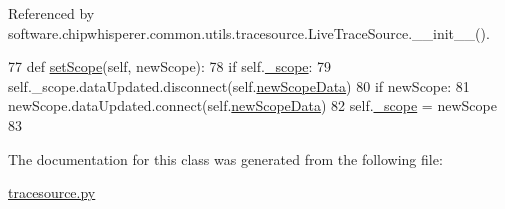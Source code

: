 Referenced by software.\+chipwhisperer.\+common.\+utils.\+tracesource.\+Live\+Trace\+Source.\+\_\+\+\_\+init\+\_\+\+\_\+().


\begin{DoxyCode}
77     \textcolor{keyword}{def }\hyperlink{classsoftware_1_1chipwhisperer_1_1common_1_1utils_1_1tracesource_1_1LiveTraceSource_a8530d7d44e220140a0b226c1f4ebc00d}{setScope}(self, newScope):
78         \textcolor{keywordflow}{if} self.\hyperlink{classsoftware_1_1chipwhisperer_1_1common_1_1utils_1_1tracesource_1_1LiveTraceSource_accb516e273188c642ac78e575f8a7dff}{\_scope}:
79             self.\_scope.dataUpdated.disconnect(self.\hyperlink{classsoftware_1_1chipwhisperer_1_1common_1_1utils_1_1tracesource_1_1LiveTraceSource_a34883c8896eecdf659f3de2da98421b6}{newScopeData})
80         \textcolor{keywordflow}{if} newScope:
81             newScope.dataUpdated.connect(self.\hyperlink{classsoftware_1_1chipwhisperer_1_1common_1_1utils_1_1tracesource_1_1LiveTraceSource_a34883c8896eecdf659f3de2da98421b6}{newScopeData})
82         self.\hyperlink{classsoftware_1_1chipwhisperer_1_1common_1_1utils_1_1tracesource_1_1LiveTraceSource_accb516e273188c642ac78e575f8a7dff}{\_scope} = newScope
83 
\end{DoxyCode}


The documentation for this class was generated from the following file\+:\begin{DoxyCompactItemize}
\item 
\hyperlink{tracesource_8py}{tracesource.\+py}\end{DoxyCompactItemize}
